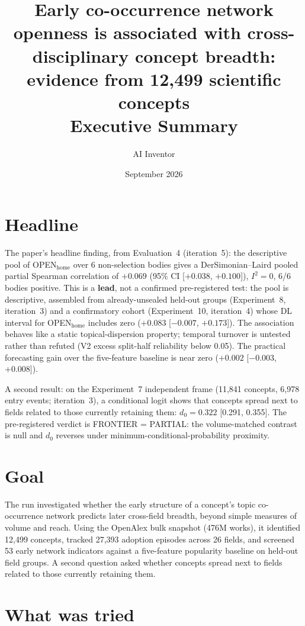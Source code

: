 \documentclass[10pt,letterpaper]{article}
\title{\vspace{-1.5em}Early co-occurrence network openness is associated with cross-disciplinary concept breadth: evidence from 12,499 scientific concepts\\[0.3em]\large Executive Summary\vspace{-0.5em}}
\author{AI Inventor}
\date{September 2026}
\begin{document}
\maketitle
\vspace{-1em}

\section{Headline}

The paper's headline finding, from Evaluation~4 (iteration~5): the descriptive pool of OPEN$_{\text{home}}$ over 6 non-selection bodies gives a DerSimonian--Laird pooled partial Spearman correlation of $+0.069$ (95\% CI [$+0.038$, $+0.100$]), $I^2 = 0$, 6/6 bodies positive. This is a \textbf{lead}, not a confirmed pre-registered test: the pool is descriptive, assembled from already-unsealed held-out groups (Experiment~8, iteration~3) and a confirmatory cohort (Experiment~10, iteration~4) whose DL interval for OPEN$_{\text{home}}$ includes zero ($+0.083$ [$-0.007$, $+0.173$]). The association behaves like a static topical-dispersion property; temporal turnover is untested rather than refuted (V2 excess split-half reliability below 0.05). The practical forecasting gain over the five-feature baseline is near zero ($+0.002$ [$-0.003$, $+0.008$]).

A second result: on the Experiment~7 independent frame (11,841 concepts, 6,978 entry events; iteration~3), a conditional logit shows that concepts spread next to fields related to those currently retaining them: $d_0 = 0.322$ [0.291, 0.355]. The pre-registered verdict is FRONTIER = PARTIAL: the volume-matched contrast is null and $d_0$ reverses under minimum-conditional-probability proximity.

\section{Goal}

The run investigated whether the early structure of a concept's topic co-occurrence network predicts later cross-field breadth, beyond simple measures of volume and reach. Using the OpenAlex bulk snapshot (476M works), it identified 12,499 concepts, tracked 27,393 adoption episodes across 26 fields, and screened 53 early network indicators against a five-feature popularity baseline on held-out field groups. A second question asked whether concepts spread next to fields related to those currently retaining them.

\section{What was tried}
\end{document}
